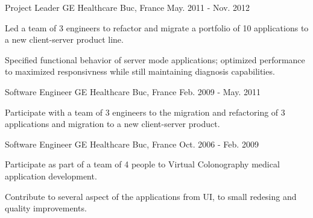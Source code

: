 \begin{cventries}
  \cventry
    {Project Leader} %
    {GE Healthcare} %
    {Buc, France} %
    {May. 2011 - Nov. 2012} %
    {
      \begin{cvitems} %
        \item {Led a team of 3 engineers to refactor and migrate a portfolio of 10 applications to a new client-server product line.}
        \item {Specified functional behavior of server mode applications; optimized performance to maximized responsivness while still maintaining diagnosis capabilities.}
      \end{cvitems}
    }

  \cventry
    {Software Engineer} %
    {GE Healthcare} %
    {Buc, France} %
    {Feb. 2009 - May. 2011} %
    {
      \begin{cvitems} %
        \item {Participate with a team of 3 engineers to the migration and refactoring of 3 applications and migration to a new client-server product.}
      \end{cvitems}
    }

  \cventry
    {Software Engineer} %
    {GE Healthcare} %
    {Buc, France} %
    {Oct. 2006 - Feb. 2009} %
    {
      \begin{cvitems} %
        \item {Participate as part of a team of 4 people to Virtual Colonography medical application development.}
        \item {Contribute to several aspect of the applications from UI, to small redesing and quality improvements.}
      \end{cvitems}
    }


\end{cventries}
